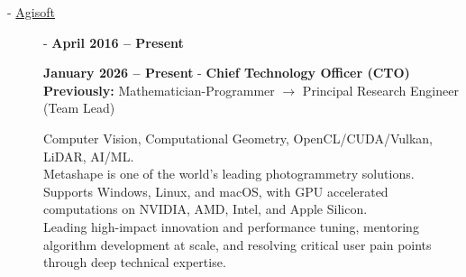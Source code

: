 \documentclass[11pt,oneside]{article}
\newcommand{\hhref}[2]{\href{#1}{\color{blue}#2}}
\begin{document}
\begin{description}

  \item[ - \hhref{https://www.agisoft.com/}{Agisoft}] - \textbf{April 2016 -- Present}

    \textbf{January 2026 -- Present} - \textbf{Chief Technology Officer (CTO)}\\
    \textbf{Previously:} Mathematician-Programmer $\rightarrow$ Principal Research Engineer (Team Lead)

    Computer Vision, Computational Geometry, OpenCL/CUDA/Vulkan, LiDAR, AI/ML.\\
    Metashape is one of the world's leading photogrammetry solutions. Supports Windows, Linux, and macOS, with GPU accelerated computations on NVIDIA, AMD, Intel, and Apple Silicon.\\
    Leading high-impact innovation and performance tuning, mentoring algorithm development at scale, and resolving critical user pain points through deep technical expertise.


\end{description}
\end{document}
